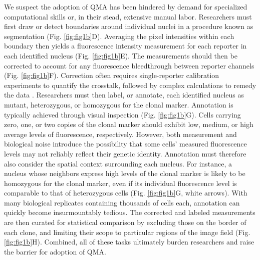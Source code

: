 We suspect the adoption of QMA has been hindered by demand for specialized computational skills or, in their stead, extensive manual labor. Researchers must first draw or detect boundaries around individual nuclei in a procedure known as segmentation (Fig. \ref{fig:fig1b}D). Averaging the pixel intensities within each boundary then yields a fluorescence intensity measurement for each reporter in each identified nucleus (Fig. \ref{fig:fig1b}E). The measurements should then be corrected to account for any fluorescence bleedthrough between reporter channels (Fig. \ref{fig:fig1b}F). Correction often requires single-reporter calibration experiments to quantify the crosstalk, followed by complex calculations to remedy the data \cite{Bacia2012,Elangovan2003}. Researchers must then label, or annotate, each identified nucleus as mutant, heterozygous, or homozygous for the clonal marker. Annotation is typically achieved through visual inspection (Fig. \ref{fig:fig1b}G). Cells carrying zero, one, or two copies of the clonal marker should exhibit low, medium, or high average levels of fluorescence, respectively. However, both measurement and biological noise introduce the possibility that some cells’ measured fluorescence levels may not reliably reflect their genetic identity. Annotation must therefore also consider the spatial context surrounding each nucleus. For instance, a nucleus whose neighbors express high levels of the clonal marker is likely to be homozygous for the clonal marker, even if its individual fluorescence level is comparable to that of heterozygous cells (Fig. \ref{fig:fig1b}G, white arrows). With many biological replicates containing thousands of cells each, annotation can quickly become insurmountably tedious. The corrected and labeled measurements are then curated for statistical comparison by excluding those on the border of each clone, and limiting their scope to particular regions of the image field (Fig. \ref{fig:fig1b}H). Combined, all of these tasks ultimately burden researchers and raise the barrier for adoption of QMA. 

